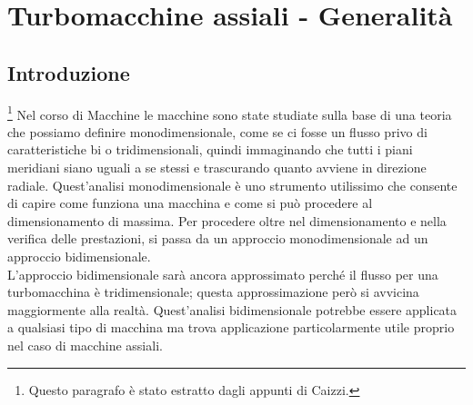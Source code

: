 \chapter{Turbomacchine assiali - Generalità}

\section{Introduzione}
\footnote{Questo paragrafo è stato estratto dagli appunti di Caizzi.} Nel corso di Macchine le macchine sono state studiate sulla base di una teoria che possiamo definire monodimensionale, come se ci fosse un flusso privo di caratteristiche bi o tridimensionali, quindi immaginando che tutti i piani meridiani siano uguali a se stessi e trascurando quanto avviene in direzione radiale. Quest'analisi monodimensionale è uno strumento utilissimo che consente di capire come funziona una macchina e come si può procedere al dimensionamento di massima. Per procedere oltre nel dimensionamento e nella verifica delle prestazioni, si passa da un approccio monodimensionale ad un approccio bidimensionale.\\
L’approccio bidimensionale sarà ancora approssimato perché il flusso per una turbomacchina è tridimensionale; questa approssimazione però si avvicina maggiormente alla realtà. Quest'analisi bidimensionale potrebbe essere applicata a qualsiasi tipo di macchina ma trova applicazione particolarmente utile proprio nel caso di macchine assiali.

